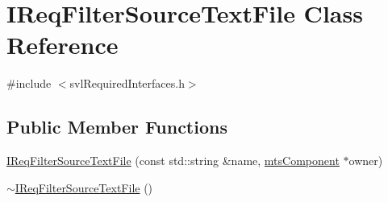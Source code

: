 \hypertarget{class_i_req_filter_source_text_file}{}\section{I\+Req\+Filter\+Source\+Text\+File Class Reference}
\label{class_i_req_filter_source_text_file}


{\ttfamily \#include $<$svl\+Required\+Interfaces.\+h$>$}

\subsection*{Public Member Functions}
\begin{DoxyCompactItemize}
\item 
\hyperlink{class_i_req_filter_source_text_file_aa51f31b7f57a8af34339781df6f05342}{I\+Req\+Filter\+Source\+Text\+File} (const std\+::string \&name, \hyperlink{classmts_component}{mts\+Component} $\ast$owner)
\item 
\hyperlink{class_i_req_filter_source_text_file_ae7d3cd4c4e8b712432dbfc42eadc6f03}{$\sim$\+I\+Req\+Filter\+Source\+Text\+File} ()
\end{DoxyCompactItemize}
